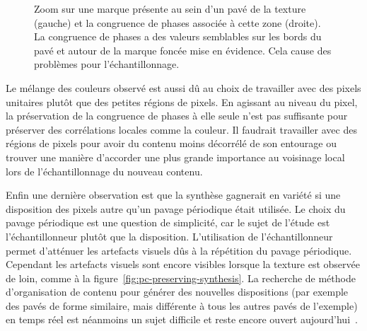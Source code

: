 \begin{figure}
\begin{subfigure}{.45\textwidth}
    \end{subfigure}

    \caption[Problème d'échantillonnage dû à la présence de marques au sein des pavés de la texture]{Zoom sur une marque présente au sein d'un pavé de la texture (gauche) et la congruence de phases associée à cette zone (droite). La congruence de phases a des valeurs semblables sur les bords du pavé et autour de la marque foncée mise en évidence. Cela cause des problèmes pour l'échantillonnage.}
    \label{fig:pc-defect}
\end{figure}

Le mélange des couleurs observé est aussi dû au choix de travailler avec des pixels unitaires plutôt que des petites régions de pixels. En agissant au niveau du pixel, la préservation de la congruence de phases à elle seule n'est pas suffisante pour préserver des corrélations locales comme la couleur. Il faudrait travailler avec des régions de pixels pour avoir du contenu moins décorrélé de son entourage ou trouver une manière d'accorder une plus grande importance au voisinage local lors de l'échantillonnage du nouveau contenu.

\bigskip

Enfin une dernière observation est que la synthèse gagnerait en variété si une disposition des pixels autre qu'un pavage périodique était utilisée. Le choix du pavage périodique est une question de simplicité, car le sujet de l'étude est l'échantillonneur plutôt que la disposition. L'utilisation de l'échantillonneur permet d'atténuer les artefacts visuels dûs à la répétition du pavage périodique. Cependant les artefacts visuels sont encore visibles lorsque la texture est observée de loin, comme à la figure~\ref{fig:pc-preserving-synthesis}. La recherche de méthode d'organisation de contenu pour générer des nouvelles dispositions (par exemple des pavés de forme similaire, mais différente à tous les autres pavés de l'exemple) en temps réel est néanmoins un sujet difficile et reste encore ouvert aujourd'hui~\cite{baldi_differentiable_2023, guehl_semi-procedural_2020}.
